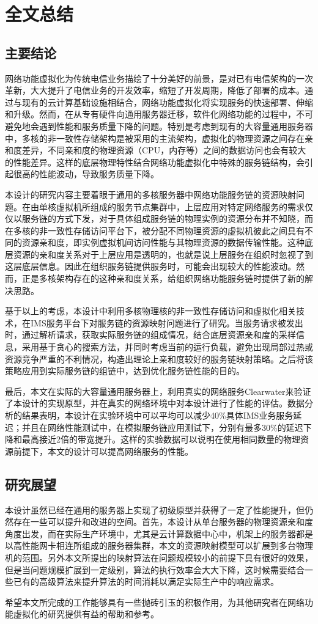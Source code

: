 \chapter{全文总结}
\label{chapter:conclusion}

\section{主要结论}
网络功能虚拟化为传统电信业务描绘了十分美好的前景，是对已有电信架构的一次革新，大大提升了电信业务的开发效率，缩短了开发周期，降低了部署的成本。通过与现有的云计算基础设施相结合，网络功能虚拟化将实现服务的快速部署、伸缩和升级。然而，在从专有硬件向通用服务器迁移，软件化网络功能的过程中，不可避免地会遇到性能和服务质量下降的问题。特别是考虑到现有的大容量通用服务器中，多核的非一致性存储架构是被采用的主流架构，虚拟化的物理资源之间存在亲和度差异，不同亲和度的物理资源（CPU，内存等）之间的数据访问也会有较大的性能差异。这样的底层物理特性结合网络功能虚拟化中特殊的服务链结构，会引起很高的性能波动，导致服务质量下降。

本设计的研究内容主要着眼于通用的多核服务器中网络功能服务链的资源映射问题。在由单核虚拟机所组成的服务节点集群中，上层应用对特定网络服务的需求仅仅以服务链的方式下发，对于具体组成服务链的物理实例的资源分布并不知晓，而在多核的非一致性存储访问平台下，被分配不同物理资源的虚拟机彼此之间具有不同的资源亲和度，即实例虚拟机间访问性能与其物理资源的数据传输性能。这种底层资源的亲和度关系对于上层应用是透明的，也就是说上层服务在组织时忽视了到这层底层信息。因此在组织服务链提供服务时，可能会出现较大的性能波动。然而，正是多核架构存在的这种亲和度关系，给组织网络功能服务链时提供了新的解决思路。

基于以上的考虑，本设计中利用多核物理核的非一致性存储访问和虚拟化相关技术，在IMS服务平台下对服务链的资源映射问题进行了研究。当服务请求被发出时，通过解析请求，获取实际服务链的组成情况，结合底层资源亲和度的采样信息，采用基于贪心的搜索方法，并同时考虑当前的运行负载，避免出现局部过热或资源竞争严重的不利情况，构造出理论上亲和度较好的服务链映射策略。之后将该策略应用到实际服务链的组链中，达到优化服务链性能的目的。

最后，本文在实际的大容量通用服务器上，利用真实的网络服务Clearwater来验证了本设计的实现原型，并在真实的网络环境中对本设计进行了性能的评估。数据分析的结果表明，本设计在实验环境中可以平均可以减少40\%具体IMS业务服务延迟；并且在网络性能测试中，在模拟服务链应用测试下，分别有最多30\%的延迟下降和最高接近2倍的带宽提升。这样的实验数据可以说明在使用相同数量的物理资源前提下，本文的设计可以提高网络服务的性能。

\section{研究展望}
本设计虽然已经在通用的服务器上实现了初级原型并获得了一定了性能提升，但仍然存在一些可以提升和改进的空间。首先，本设计从单台服务器的物理资源亲和度角度出发，而在实际生产环境中，尤其是云计算数据中心中，机架上的服务器都是以高性能网卡相连所组成的服务器集群，本文的资源映射模型可以扩展到多台物理机的范围。另外本文所提出的映射算法在问题规模较小的前提下具有很好的效果，但是当问题规模扩展到一定级别，算法的执行效率会大大下降，这时候需要结合一些已有的高级算法来提升算法的时间消耗以满足实际生产中的响应需求。

希望本文所完成的工作能够具有一些抛砖引玉的积极作用，为其他研究者在网络功能虚拟化的研究提供有益的帮助和参考。
